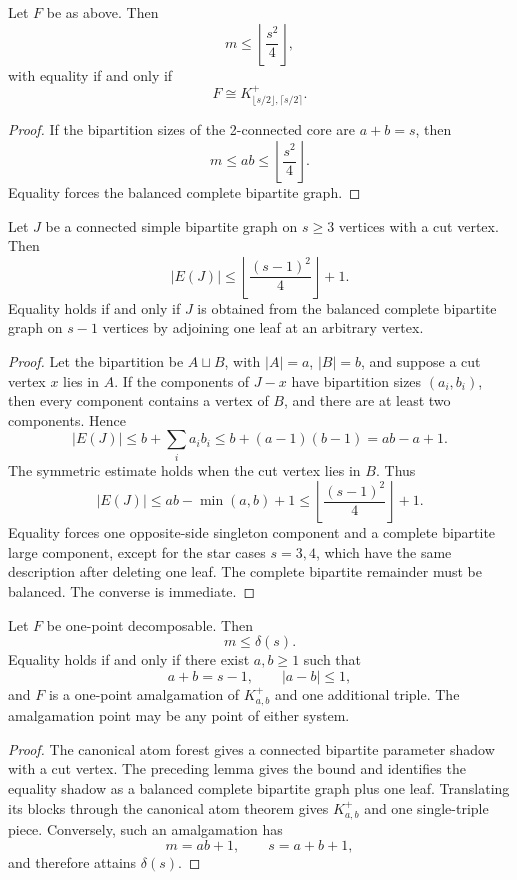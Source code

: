 \begin{theorem}
Let \(F\) be as above.  Then
\[
 m\le \left\lfloor\frac{s^2}{4}\right\rfloor,
\]
with equality if and only if
\[
 F\cong K_{\lfloor s/2\rfloor,\lceil s/2\rceil}^{+}.
\]
\end{theorem}

\begin{proof}
If the bipartition sizes of the 2-connected core are \(a+b=s\), then
\[
 m\le ab\le\left\lfloor\frac{s^2}{4}\right\rfloor.
\]
Equality forces the balanced complete bipartite graph.
\end{proof}

\begin{lemma}
Let \(J\) be a connected simple bipartite graph on \(s\ge3\) vertices with a
cut vertex.  Then
\[
 |E(J)|\le
 \left\lfloor\frac{(s-1)^2}{4}\right\rfloor+1.
\]
Equality holds if and only if \(J\) is obtained from the balanced complete
bipartite graph on \(s-1\) vertices by adjoining one leaf at an arbitrary
vertex.
\end{lemma}

\begin{proof}
Let the bipartition be \(A\sqcup B\), with \(|A|=a\), \(|B|=b\), and suppose
a cut vertex \(x\) lies in \(A\).  If the components of \(J-x\) have
bipartition sizes \((a_i,b_i)\), then every component contains a vertex of
\(B\), and there are at least two components.  Hence
\[
 |E(J)|
 \le b+\sum_i a_i b_i
 \le b+(a-1)(b-1)
 =ab-a+1.
\]
The symmetric estimate holds when the cut vertex lies in \(B\).  Thus
\[
 |E(J)|\le ab-\min(a,b)+1
 \le \left\lfloor\frac{(s-1)^2}{4}\right\rfloor+1.
\]
Equality forces one opposite-side singleton component and a complete
bipartite large component, except for the star cases \(s=3,4\), which have the
same description after deleting one leaf.  The complete bipartite remainder
must be balanced.  The converse is immediate.
\end{proof}

\begin{theorem}
Let \(F\) be one-point decomposable.  Then
\[
 m\le\delta(s).
\]
Equality holds if and only if there exist \(a,b\ge1\) such that
\[
 a+b=s-1,\qquad |a-b|\le1,
\]
and \(F\) is a one-point amalgamation of \(K_{a,b}^+\) and one additional
triple.  The amalgamation point may be any point of either system.
\end{theorem}

\begin{proof}
The canonical atom forest gives a connected bipartite parameter shadow with a
cut vertex.  The preceding lemma gives the bound and identifies the equality
shadow as a balanced complete bipartite graph plus one leaf.  Translating its
blocks through the canonical atom theorem gives \(K_{a,b}^+\) and one
single-triple piece.  Conversely, such an amalgamation has
\[
 m=ab+1,\qquad s=a+b+1,
\]
and therefore attains \(\delta(s)\).
\end{proof}

